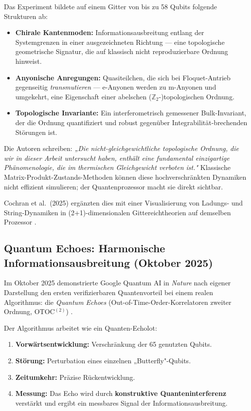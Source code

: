 \begin{keyresult}
Das Experiment bildete auf einem Gitter von bis zu 58 Qubits folgende Strukturen ab:
\begin{itemize}
    \item \textbf{Chirale Kantenmoden:} Informationsausbreitung entlang der
    Systemgrenzen in einer ausgezeichneten Richtung — eine topologische geometrische
    Signatur, die auf klassisch nicht reproduzierbare Ordnung hinweist.
    \item \textbf{Anyonische Anregungen:} Quasiteilchen, die sich bei Floquet-Antrieb
    gegenseitig \emph{transmutieren} — e-Anyonen werden zu m-Anyonen und umgekehrt,
    eine Eigenschaft einer abelschen ($\mathbb{Z}_2$-)topologischen Ordnung.
    \item \textbf{Topologische Invariante:} Ein interferometrisch gemessener
    Bulk-Invariant, der die Ordnung quantifiziert und robust gegenüber
    Integrabilität-brechenden Störungen ist.
\end{itemize}
\end{keyresult}

Die Autoren schreiben: \textit{„Die nicht-gleichgewichtliche topologische Ordnung,
die wir in dieser Arbeit untersucht haben, enthält eine fundamental einzigartige
Phänomenologie, die im thermischen Gleichgewicht verboten ist."} \cite{Will2025Nature}
Klassische Matrix-Produkt-Zustands-Methoden können diese hochverschränkten
Dynamiken nicht effizient simulieren; der Quantenprozessor macht sie direkt sichtbar.

Cochran et al.\ (2025) ergänzten dies mit einer Visualisierung von Ladungs- und
String-Dynamiken in (2+1)-dimensionalen Gittereichtheorien auf demselben Prozessor
\cite{Cochran2025Nature}.

\subsection{Quantum Echoes: Harmonische Informationsausbreitung (Oktober 2025)}

Im Oktober 2025 demonstrierte Google Quantum AI in \textit{Nature} nach eigener Darstellung den ersten
verifizierbaren Quantenvorteil bei einem realen Algorithmus: die \emph{Quantum Echoes}
(Out-of-Time-Order-Korrelatoren zweiter Ordnung, OTOC$^{(2)}$) \cite{GoogleEchoes2025}.

Der Algorithmus arbeitet wie ein Quanten-Echolot:
\begin{enumerate}
    \item \textbf{Vorwärtsentwicklung:} Verschränkung der 65 genutzten Qubits.
    \item \textbf{Störung:} Perturbation eines einzelnen „Butterfly"-Qubits.
    \item \textbf{Zeitumkehr:} Präzise Rückentwicklung.
    \item \textbf{Messung:} Das Echo wird durch \textbf{konstruktive Quanteninterferenz}
    verstärkt und ergibt ein messbares Signal der Informationsausbreitung.
\end{enumerate}

